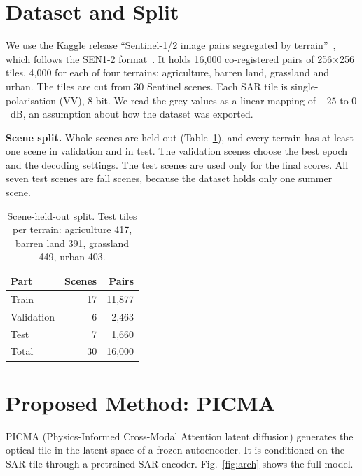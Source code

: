 \documentclass[conference]{IEEEtran}
\begin{document}
\section{Dataset and Split}

We use the Kaggle release ``Sentinel-1/2 image pairs segregated by
terrain''~\cite{requiemonk_dataset}, which follows the SEN1-2 format~\cite{schmitt2018sen12}.
It holds 16{,}000 co-registered pairs of 256$\times$256 tiles, 4{,}000 for each of four
terrains: agriculture, barren land, grassland and urban. The tiles are cut from 30 Sentinel
scenes. Each SAR tile is single-polarisation (VV), 8-bit. We read the grey values as a linear
mapping of $-25$ to $0$~dB, an assumption about how the dataset was exported.

\textbf{Scene split.} Whole scenes are held out (Table~\ref{tab:split}), and every terrain
has at least one scene in validation and in test. The validation scenes choose the best
epoch and the decoding settings. The test scenes are used only for the final scores. All
seven test scenes are fall scenes, because the dataset holds only one summer scene.

\begin{table}[t]
\centering
\caption{Scene-held-out split. Test tiles per terrain: agriculture 417, barren land 391,
grassland 449, urban 403.}
\label{tab:split}
\begin{tabular}{lrr}
\toprule
Part & Scenes & Pairs \\
\midrule
Train & 17 & 11{,}877 \\
Validation & 6 & 2{,}463 \\
Test & 7 & 1{,}660 \\
\midrule
Total & 30 & 16{,}000 \\
\bottomrule
\end{tabular}
\end{table}

\section{Proposed Method: PICMA}

PICMA (Physics-Informed Cross-Modal Attention latent diffusion) generates the optical tile
in the latent space of a frozen autoencoder. It is conditioned on the SAR tile through a
pretrained SAR encoder. Fig.~\ref{fig:arch} shows the full model.
\end{document}
